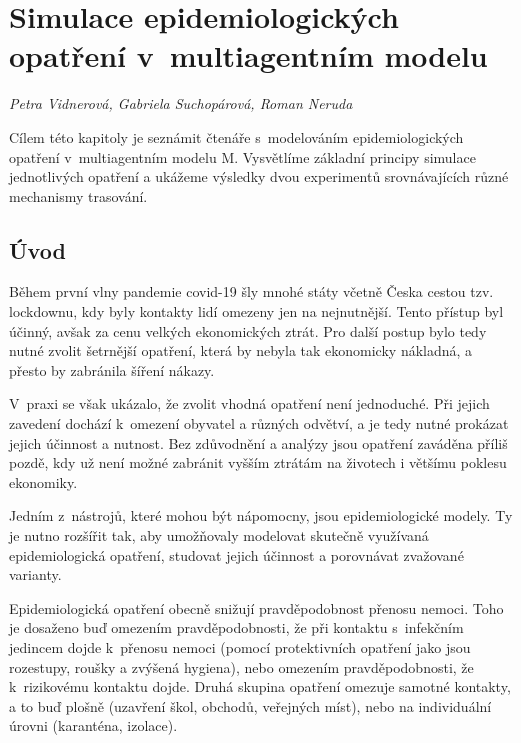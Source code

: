 
\chapter[Simulace v~multiagentním modelu]{Simulace epidemiologických opatření v~multiagentním modelu}
\label{Evaluace_politik}

\textit{Petra Vidnerová, Gabriela Suchopárová, Roman Neruda}
\vspace{15mm}

\noindent Cílem této kapitoly je seznámit čtenáře s~modelováním
epidemiologických o\-pat\-ře\-ní v~multiagentním modelu M. Vysvětlíme
základní principy simulace jednotlivých opatření a ukážeme výsledky
dvou experimentů srovnávajících různé mechanismy trasování.


\section*{Úvod}

Během první vlny pandemie covid-19 šly mnohé státy včetně Česka
cestou tzv. lock\-downu, kdy byly kontakty lidí omezeny jen na
nejnutnější. Tento přístup byl účinný, avšak za cenu velkých
ekonomických ztrát. Pro další postup bylo tedy nutné zvolit šetrnější
opatření, která by nebyla tak ekonomicky nákladná, a přesto by zabránila šíření nákazy.

V~praxi se však ukázalo, že zvolit vhodná opatření není
jednoduché. Při jejich zavedení dochází k~omezení obyvatel a různých
odvětví, a je tedy nutné prokázat jejich účinnost a nutnost. Bez
zdůvodnění a analýzy jsou opatření zaváděna příliš pozdě, kdy už není
možné zabránit vyšším ztrátám na životech i většímu poklesu ekonomiky.

Jedním z~nástrojů, které mohou být nápomocny, jsou epidemiologické
modely. Ty je nutno rozšířit tak, aby umožňovaly modelovat skutečně
využívaná epidemiologická opatření, studovat jejich účinnost a
porovnávat zvažované varianty.

Epidemiologická opatření obecně snižují pravděpodobnost přenosu nemoci. Toho
je dosaženo buď omezením pravděpodobnosti, že při kontaktu s~infekčním jedincem
dojde k~přenosu nemoci (pomocí protektivních opatření jako jsou rozestupy, roušky
a zvýšená hygiena), nebo omezením pravděpodobnosti, že k~rizikovému kontaktu
dojde. Druhá skupina opatření omezuje samotné kontakty, a to buď plošně
(uzavření škol, obchodů, veřejných míst), nebo na individuální úrovni
(karanténa, izolace).




